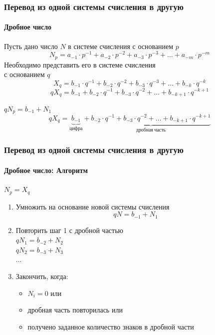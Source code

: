 \begin{frame}
  \frametitle{Перевод из одной системы счисления в другую}
	\framesubtitle{Дробное число}
	Пусть дано число $N$ в системе счисления с основанием $p$
	$$
	N_p=a_{-1}\cdot p^{-1}+a_{-2}\cdot p^{-2}+a_{-3}\cdot p^{-3}+\ldots + a_{-m}\cdot p^{-m}
	$$	
	Необходимо представить его в системе счисления \\ с основанием $q$
	$$
	X_q=b_{-1}\cdot q^{-1}+b_{-2}\cdot q^{-2}+b_{-3}\cdot q^{-3}+\ldots + b_{-k}\cdot q^{-k}
	$$	
	\pause
	$$
	qX_q=b_{-1}+b_{-2}\cdot q^{-1}+b_{-3}\cdot q^{-2}+\ldots + b_{-k+1}\cdot q^{-k+1}
	$$
	
	\pause
	$qN_p=b_{-1}+N_1$
	$$
	qX_q=\underbrace{b_{-1}}_{цифра}+\underbrace{b_{-2}\cdot q^{-1}+b_{-3}\cdot q^{-2}+\ldots + b_{-k+1}\cdot q^{-k+1}}_{дробная \; часть}
	$$
	
	
\end{frame}

\begin{frame}
  \frametitle{Перевод из одной системы счисления в другую}
	\framesubtitle{Дробное число: Алгоритм}
	$N_p=X_q$
	\begin{enumerate}
		\item Умножить на основание новой системы счисления
		$$ qN=b_{-1}+N_1 $$
		\item Повторить шаг 1 с дробной частью \\
		$ qN_1=b_{-2}+N_2 $\\
		$ qN_2=b_{-3}+N_3 $\\
		$ \ldots $
		\item Закончить, когда:
		\begin{itemize}
			\item $N_i =0 $ или 
			\item дробная часть повторилась или 
			\item получено заданное количество знаков в дробной части
		\end{itemize}
		
		
	\end{enumerate}
	
	
\end{frame}


